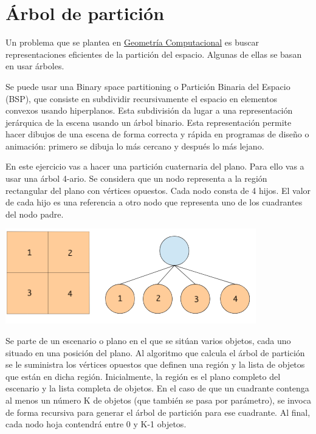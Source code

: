 
%






\separacion
\section{Árbol de partición} 

Un problema que se plantea en \href{https://es.wikipedia.org/wiki/Geometría\_computacional}{Geometría Computacional} es buscar representaciones eficientes de la partición del espacio. Algunas de ellas se basan en usar árboles. 

Se puede usar una  Binary space partitioning o Partición Binaria del Espacio (BSP), que consiste en subdividir recursivamente el espacio en elementos convexos usando hiperplanos. Esta subdivisión da lugar a una representación jerárquica de la escena usando un árbol binario. Esta representación permite hacer dibujos de una escena de forma correcta y rápida en programas de diseño o animación: primero se dibuja lo más cercano y después lo más lejano.

En este ejercicio vas a hacer una partición cuaternaria del plano. Para ello vas a usar una árbol 4-ario. Se considera que un nodo representa a la región rectangular del plano con vértices opuestos. Cada nodo consta de 4 hijos. El valor de cada hijo es una referencia a otro nodo que representa uno de los cuadrantes del nodo padre.

\centerline{\includegraphics[width=.3\textwidth]{input/06-Graph-fig/quadtree}}

Se parte de un escenario o plano en el que se sitúan varios objetos, cada uno situado en una posición del plano. Al algoritmo que calcula el árbol de partición se le suministra los vértices opuestos que definen una región y  la lista de objetos que están en dicha región. Inicialmente, la región es el plano completo del escenario y la lista completa de objetos. En el caso de que un cuadrante contenga al menos un número K de objetos (que también se pasa por parámetro), se invoca de forma recursiva para generar el árbol de partición para ese cuadrante. Al final, cada nodo hoja contendrá entre 0 y K-1 objetos.

